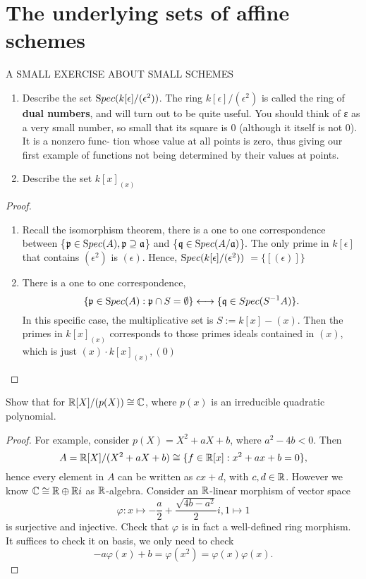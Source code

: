 \documentclass[11pt,fleqn]{book}
\begin{document}
\section{The underlying sets of affine schemes}
\begin{exr}
A SMALL EXERCISE ABOUT SMALL SCHEMES
\begin{enumerate}[label=(\alph*)]
\item Describe the set ${\text Spec}(k[\epsilon]/(\epsilon^2)) $. The ring $k[\epsilon]/(\epsilon^2)$ is called the ring of \textbf{dual numbers}, and will turn out to be quite useful. You should think of ε as a very small number, so small that its square is 0 (although it itself is not 0). It is a nonzero func- tion whose value at all points is zero, thus giving our first example of functions not being determined by their values at points.
\item Describe the set $k[x]_{(x)}$
\end{enumerate}
\end{exr}
\begin{proof}\ 
\begin{enumerate}[label=(\alph*)]
\item Recall the isomorphism theorem, there is a one to one correspondence between \{${\mathfrak p}\in {\text Spec}(A),{\mathfrak p}\supseteq {\mathfrak a}$\} and \{$\mathfrak q\in {\text Spec}(A/{\mathfrak a})$\}. The only prime in $k[\epsilon]$ that contains $(\epsilon^2)$ is $(\epsilon)$. Hence, ${\text Spec}(k[\epsilon]/(\epsilon^2))$ $=\{[(\epsilon)]\}$
\item  There is a one to one correspondence,
$$
\{{\mathfrak p}\in {\text Spec}(A):{\mathfrak p}\cap S=\emptyset \}\longleftrightarrow\{\mathfrak q\in Spec(S^{-1}A)\}.
$$
In this specific case, the multiplicative set is $S:=k[x]-(x)$. Then the primes in $k[x]_{(x)}$ corresponds to those primes ideals contained in $(x)$, which is just $(x)\cdot k[x]_{(x)},(0)$  

\end{enumerate}
\end{proof}

\begin{exr}
Show that for $\mathbb R[X]/(p(X))\cong\mathbb C$, where $p(x)$ is an irreducible quadratic polynomial.
\end{exr}
\begin{proof}
For example, consider $p(X)=X^2+aX+b$, where $a^2-4b<0$. Then 
$$
A=\mathbb R[X]/(X^2+aX+b)\cong \{f\in\mathbb R[x]: x^2+ax+b=0\},
$$
hence every element in $A$ can be written as  $cx+d$, with $c,d\in\mathbb R$. However we know $\mathbb C\cong\mathbb R\oplus\mathbb R i$ as $\mathbb R$-algebra. Consider an $\mathbb R$-linear morphism of vector space 
$$
\varphi:x\longmapsto -\frac{a}{2}+\frac{\sqrt{4b-a^2}}{2} i, 1\longmapsto 1
$$ 
is surjective and injective. Check that $\varphi$ is in fact a well-defined ring morphism. It suffices to check it on basis, we only need to check 
$$
-a\varphi(x)+b=\varphi(x^2)=\varphi(x)\varphi(x).
$$
\end{proof}
\end{document}
